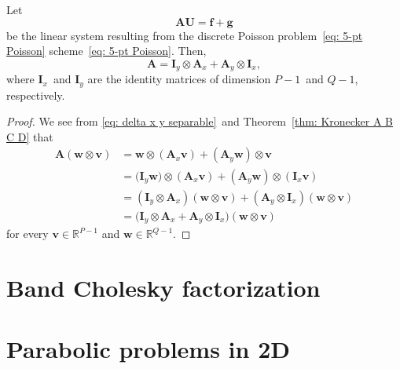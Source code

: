 \begin{theorem}
Let
\[
\boldsymbol{A}\boldsymbol{U}=\boldsymbol{f}+\boldsymbol{g}
\]
be the linear system resulting from the discrete Poisson 
problem~\eqref{eq: 5-pt Poisson} scheme~\eqref{eq: 5-pt Poisson}.  Then,
\[
\boldsymbol{A}=\boldsymbol{I}_y\otimes\boldsymbol{A}_x
    +\boldsymbol{A}_y\otimes\boldsymbol{I}_x,
\]
where $\boldsymbol{I}_x$~and $\boldsymbol{I}_y$ are the identity matrices of 
dimension $P-1$~and $Q-1$, respectively.
\end{theorem}
\begin{proof}
We see from \eqref{eq: delta x y separable}~and 
Theorem~\ref{thm: Kronecker A B C D} that
\begin{align*}
\boldsymbol{A}(\boldsymbol{w}\otimes\boldsymbol{v})
    &=\boldsymbol{w}\otimes(\boldsymbol{A}_x\boldsymbol{v})
    +(\boldsymbol{A}_y\boldsymbol{w})\otimes\boldsymbol{v}\\
    &=\bigl(\boldsymbol{I}_y\boldsymbol{w})
        \otimes(\boldsymbol{A}_x\boldsymbol{v})
    +(\boldsymbol{A}_y\boldsymbol{w})
        \otimes(\boldsymbol{I}_x\boldsymbol{v})\\
    &=(\boldsymbol{I}_y\otimes\boldsymbol{A}_x)
        (\boldsymbol{w}\otimes\boldsymbol{v})
    +(\boldsymbol{A}_y\otimes\boldsymbol{I}_x)
        (\boldsymbol{w}\otimes\boldsymbol{v})\\
    &=\bigl(\boldsymbol{I}_y\otimes\boldsymbol{A}_x
    +\boldsymbol{A}_y\otimes\boldsymbol{I}_x\bigr)
        (\boldsymbol{w}\otimes\boldsymbol{v})
\end{align*}
for every $\boldsymbol{v}\in\mathbb{R}^{P-1}$ and 
$\boldsymbol{w}\in\mathbb{R}^{Q-1}$.
\end{proof}




\section{Band Cholesky factorization}

\section{Parabolic problems in 2D}

